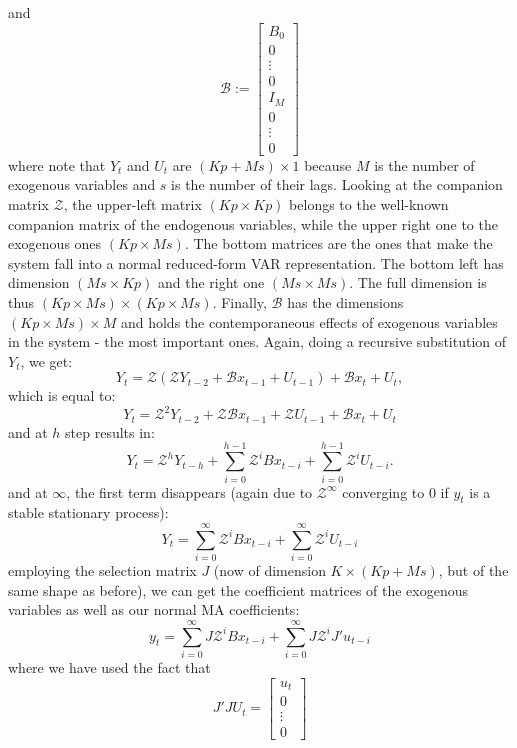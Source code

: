 \documentclass[a4paper, 12pt]{article}
\begin{document}
and 
\[
\mathcal{B} := 
\left[
\begin{array}{c}
B_0 \\
0 \\
\vdots \\
0 \\ \hline
I_M \\
0 \\
\vdots \\
0
\end{array}
\right]
\]
where note that $Y_t$ and $U_t$ are $(Kp+Ms)\times1$ because $M$ is the number of exogenous variables and $s$ is the number of their lags. 
Looking at the companion matrix $\mathcal{Z}$, the upper-left matrix $(Kp\times Kp)$ belongs to the well-known companion matrix of the endogenous variables, while the upper right one to the exogenous ones $(Kp\times Ms)$. 
The bottom matrices are the ones that make the system fall into a normal reduced-form VAR representation. The bottom left has dimension $(Ms \times Kp)$ and the right one $(Ms \times Ms)$. The full dimension is thus $(Kp \times Ms)\times (Kp \times Ms)$. Finally,
$\mathcal{B}$ has the dimensions $(Kp \times Ms)\times M$ and holds the contemporaneous effects of exogenous variables in the system - the most important ones. Again, doing a recursive substitution of $Y_{t}$, we get: 
\[
Y_t = \mathcal{Z} (\mathcal{Z} Y_{t-2} + \mathcal{B}x_{t-1} + U_{t-1}) + \mathcal{B}x_{t} + U_t,
\]
which is equal to:
\[
Y_t = \mathcal{Z}^2Y_{t-2} + \mathcal{Z}\mathcal{B}x_{t-1} +\mathcal{Z} U_{t-1} + \mathcal{B}x_{t} + U_t
\]
and at $h$ step results in:
\[
Y_{t} = \mathcal{Z}^h Y_{t-h} + \sum_{i=0}^{h-1} \mathcal{Z}^i B x_{t-i} + \sum_{i=0}^{h-1} \mathcal{Z}^i U_{t-i}.
\]
and at $\infty$, the first term disappears (again due to $\mathcal{Z}^\infty$ converging to 0 if $y_t$ is a stable stationary process):
\[
Y_{t} = \sum_{i=0}^{\infty} \mathcal{Z}^i B x_{t-i} + \sum_{i=0}^{\infty} \mathcal{Z}^i U_{t-i}
\]
employing the selection matrix $J$ (now of dimension $K\times(Kp+Ms)$, but of the same shape as before), we can get the coefficient matrices of the exogenous variables as well as our normal MA coefficients:
\[
y_{t} = \sum_{i=0}^{\infty} J\mathcal{Z}^i B x_{t-i} + \sum_{i=0}^{\infty} J\mathcal{Z}^i J'u_{t-i}
\]
where we have used the fact that 
\[J'JU_t=
\begin{bmatrix}
u_t \\
0 \\
\vdots \\
0
\end{bmatrix}
\]
\end{document}
